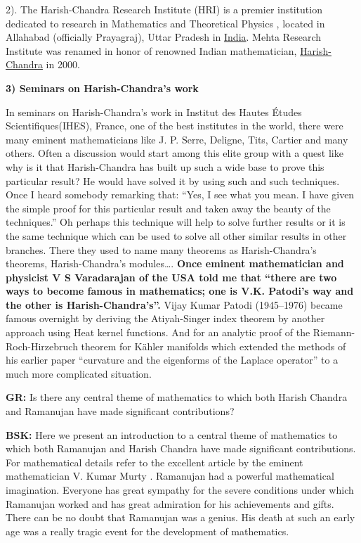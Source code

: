 2). The Harish-Chandra Research Institute (HRI) is a premier institution dedicated to research in Mathematics and Theoretical Physics , located in Allahabad (officially Prayagraj), Uttar Pradesh in \underline{India}. Mehta  Research Institute was renamed in honor of renowned Indian mathematician, \underline{Harish-Chandra} in 2000.

\textbf{3) Seminars on Harish-Chandra’s work}

In seminars on Harish-Chandra’s work in  Institut des Hautes Études Scientifiques(IHES), France, one of the best institutes in the world, there were many eminent mathematicians like J. P. Serre, Deligne, Tits, Cartier and many others.  Often a discussion would start among this elite group with a quest like why is it that Harish-Chandra has built up such a wide base to prove this particular result?  He would have solved it by using such and such techniques. Once I heard somebody remarking that: “Yes, I see what you mean. I have given the simple proof for this particular result and taken away the beauty of the techniques.” Oh perhaps this technique will help to solve further results or it is the same technique which can be used to solve all other similar results in other branches.  There they used to name many theorems as Harish-Chandra’s theorems, Harish-Chandra’s modules….  \textbf{Once eminent mathematician and physicist V S Varadarajan of the USA told me that “there are two ways to become famous in mathematics; one is V.K. Patodi’s way and the other is Harish-Chandra’s”.} Vijay Kumar Patodi (1945--1976) became famous overnight by deriving the Atiyah-Singer index theorem by another approach using Heat kernel functions. And for an analytic proof of the Riemann-Roch-Hirzebruch theorem for Kähler manifolds which extended the methods of his earlier paper “curvature and the eigenforms of the Laplace operator” to a much more complicated situation.
\vskip 2pt

\textbf{GR:} Is there any central theme of mathematics to which both Harish Chandra and Ramanujan have made significant contributions?
\vskip 2pt

\textbf{BSK:} Here we present an introduction to a central theme of mathematics to which both Ramanujan and Harish Chandra have made significant contributions. For mathematical details refer to the excellent article by the eminent mathematician V. Kumar Murty \cite{chap17-key10VKM}. Ramanujan had a powerful mathematical imagination.  Everyone has great sympathy for the severe conditions under which Ramanujan worked and has great admiration for his achievements and gifts. There can be no doubt that Ramanujan was a genius. His death at such an early age was a really tragic event for the development of mathematics.
\vskip 2pt
 
